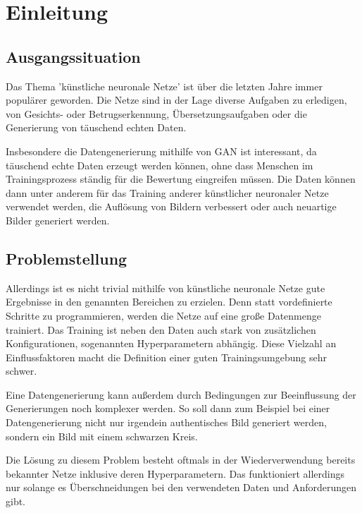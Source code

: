 
\chapter{Einleitung}
\section{Ausgangssituation}
Das Thema 'künstliche neuronale Netze' ist über die letzten Jahre immer populärer geworden.
Die Netze sind in der Lage diverse Aufgaben zu erledigen, von Gesichts- oder Betrugserkennung, Übersetzungsaufgaben oder die Generierung von täuschend echten Daten.
\newline

Insbesondere die Datengenerierung mithilfe von \acrfull{GAN} ist interessant, da täuschend echte Daten erzeugt werden können, ohne dass Menschen im Trainingsprozess ständig für die Bewertung eingreifen müssen.
Die Daten können dann unter anderem für das Training anderer künstlicher neuronaler Netze verwendet werden, die Auflösung von Bildern verbessert oder auch neuartige Bilder generiert werden.

\section{Problemstellung}
Allerdings ist es nicht trivial mithilfe von künstliche neuronale Netze gute Ergebnisse in den genannten Bereichen zu erzielen.
Denn statt vordefinierte Schritte zu programmieren, werden die Netze auf eine große Datenmenge trainiert.
Das Training ist neben den Daten auch stark von zusätzlichen Konfigurationen, sogenannten Hyperparametern abhängig.
Diese Vielzahl an Einflussfaktoren macht die Definition einer guten Trainingsumgebung sehr schwer.
\newline

Eine Datengenerierung kann außerdem durch Bedingungen zur Beeinflussung der Generierungen noch komplexer werden.
So soll dann zum Beispiel bei einer Datengenerierung nicht nur irgendein authentisches Bild generiert werden, sondern ein Bild mit einem schwarzen Kreis.
\newline

Die Lösung zu diesem Problem besteht oftmals in der Wiederverwendung bereits bekannter Netze inklusive deren Hyperparametern.
Das funktioniert allerdings nur solange es Überschneidungen bei den verwendeten Daten und Anforderungen gibt.

